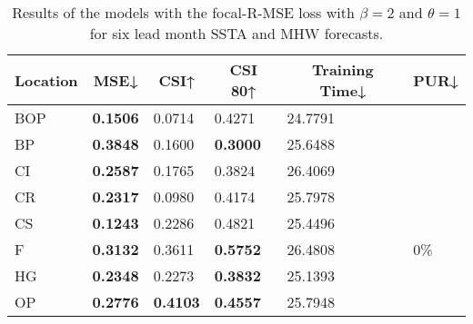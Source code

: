 \documentclass[11pt, a4paper]{article}
\begin{document}
\begin{table}[H]
\centering
\small
\caption{Results of the models with the focal-R-MSE loss with $\beta=2$ and $\theta=1$ for six lead month SSTA and MHW forecasts.}
\begin{tabular}{llllll}
\multicolumn{1}{c}{\textbf{Location}} & \multicolumn{1}{c}{\textbf{MSE↓}} & \multicolumn{1}{c}{\textbf{CSI↑}} & \multicolumn{1}{c}{\textbf{CSI 80↑}} & \multicolumn{1}{c}{\textbf{Training Time↓}} & \multicolumn{1}{c}{\textbf{PUR↓}} \\ \hline
BOP                         & \textbf{0.1506}                   & 0.0714                            & 0.4271                               & 24.7791                                     &                                   \\
BP                        & \textbf{0.3848}                   & 0.1600                            & \textbf{0.3000}                      & 25.6488                                     &                                   \\
CI                        & \textbf{0.2587}                   & 0.1765                            & 0.3824                               & 26.4069                                     &                                   \\
CR                           & \textbf{0.2317}                   & 0.0980                            & 0.4174                               & 25.7978                                     &                                   \\
CS                           & \textbf{0.1243}                   & 0.2286                            & 0.4821                               & 25.4496                                     &                                   \\
F                             & \textbf{0.3132}                   & 0.3611                            & \textbf{0.5752}                      & 26.4808                                     & 0\%                               \\
HG                          & \textbf{0.2348}                   & 0.2273                            & \textbf{0.3832}                      & 25.1393                                     &                                   \\
OP                       & \textbf{0.2776}                   & \textbf{0.4103}                   & \textbf{0.4557}                      & 25.7948                                     &                                   \\

\end{tabular}
\end{table}
\end{document}
